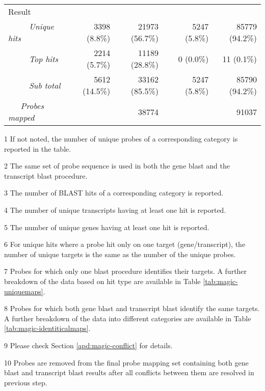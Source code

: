 \begin{table}[t]
\begin{threeparttable}
\begin{footnotesize}
\begin{tabular}{@{}p{3cm}r|rcr|r}
		\multicolumn{6}{l}{Result} \\[.2ex]
	{\it ~~~~~Unique hits} & 3398 (8.8\%) & 21973 (56.7\%) && 5247 (5.8\%) & 
	85779 (94.2\%) \\
	{\it ~~~~~Top hits} & 2214 (5.7\%) & 11189 (28.8\%) && 0 (0.0\%) & 11 
	(0.1\%) \\
	{\it ~~~~~Sub total} & 5612 (14.5\%) & 33162 (85.5\%) && 5247 (5.8\%) & 
	85790 (94.2\%) \\
	{\it ~~~Probes mapped} & \multicolumn{2}{r}{38774} && 
	\multicolumn{2}{r}{91037} \\
	\bottomrule
	\end{tabular}
	\begin{tablenotes}
	\item[1] If not noted, the number of unique probes of a corresponding 
		category is reported in the table.
	\item[2] The same set of probe sequence is used in both the gene blast and 	
		the transcript blast procedure.
	\item[3] The number of BLAST hits of a corresponding category is reported.
	\item[4] The number of unique transcripts having at least one hit is 
		reported.
	\item[5] The number of unique genes having at least one hit is reported.
	\item[6] For unique hits where a probe hit only on one target 
		(gene/transcript), the number of unique targets is the same as the 
		number of the unique probes.
	\item[7] Probes for which only one blast procedure identifies their 
		targets. A further breakdown of the data based on hit type are 
		available in Table \ref{tab:magic-uniquemaps}.
	\item[8] Probes for which both gene blast and transcript blast identify the
	 	same targets. A further breakdown of the data into different 
	 	categories are available in Table \ref{tab:magic-identiticalmaps}.
	\item[9] Please check Section \ref{apd:magic-conflict} for details.
	\item[10] Probes are removed from the final probe mapping set containing 
		both gene blast and transcript blast results after all conflicts 
		between them are resolved in previous step.
	\end{tablenotes}
	\end{footnotesize}
	\end{threeparttable}
\end{table}



